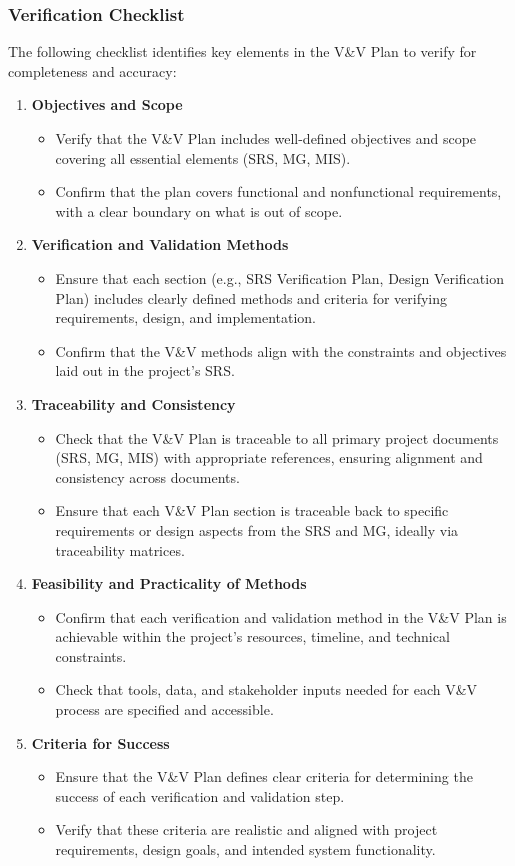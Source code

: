\documentclass[12pt, titlepage]{article}
\begin{document}
\subsubsection{Verification Checklist}
The following checklist identifies key elements in the V\&V Plan to verify for completeness and accuracy:
\begin{enumerate}
  \item \textbf{Objectives and Scope}
    \begin{itemize}
      \item Verify that the V\&V Plan includes well-defined objectives and scope covering all essential elements (SRS, MG, MIS).
      \item Confirm that the plan covers functional and nonfunctional requirements, with a clear boundary on what is out of scope.
    \end{itemize}
  \item \textbf{Verification and Validation Methods}
    \begin{itemize}
      \item Ensure that each section (e.g., SRS Verification Plan, Design Verification Plan) includes clearly defined methods and criteria for verifying requirements, design, and implementation.
      \item Confirm that the V\&V methods align with the constraints and objectives laid out in the project's SRS.
    \end{itemize}
  \item \textbf{Traceability and Consistency}
    \begin{itemize}
      \item Check that the V\&V Plan is traceable to all primary project documents (SRS, MG, MIS) with appropriate references, ensuring alignment and consistency across documents.
      \item Ensure that each V\&V Plan section is traceable back to specific requirements or design aspects from the SRS and MG, ideally via traceability matrices.
    \end{itemize}
  \item \textbf{Feasibility and Practicality of Methods}
    \begin{itemize}
      \item Confirm that each verification and validation method in the V\&V Plan is achievable within the project's resources, timeline, and technical constraints.
      \item Check that tools, data, and stakeholder inputs needed for each V\&V process are specified and accessible.
    \end{itemize}
  \item \textbf{Criteria for Success}
    \begin{itemize}
      \item Ensure that the V\&V Plan defines clear criteria for determining the success of each verification and validation step.
      \item Verify that these criteria are realistic and aligned with project requirements, design goals, and intended system functionality.
    \end{itemize}
\end{enumerate}
\end{document}
